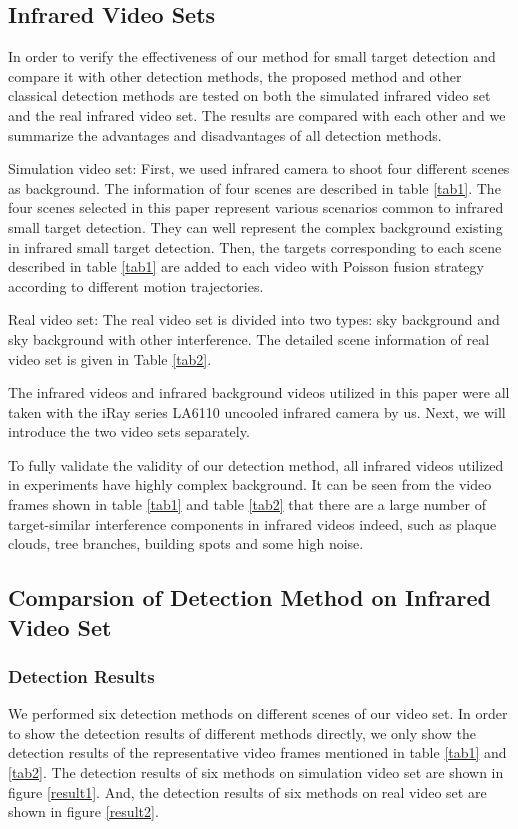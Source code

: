 \documentclass[journal]{IEEEtran}
\begin{document}
\subsection{Infrared Video Sets}
In order to verify the effectiveness of our method for small target detection and compare it with other detection methods, the proposed method and other classical detection methods are tested on both the simulated infrared video set and the real infrared video set. The results are compared with each other and we summarize the advantages and disadvantages of all detection methods.

Simulation video set: First, we used infrared camera to shoot four different scenes as background. The information of four scenes are described in table \ref{tab1}. The four scenes selected in this paper represent various scenarios common to infrared small target detection. They can well represent the complex background existing in infrared small target detection. Then, the targets corresponding to each scene described in table \ref{tab1} are added to each video with Poisson fusion strategy\cite{perez2003poisson} according to different motion trajectories.

Real video set: The real video set is divided into two types: sky background and sky background with other interference. The detailed scene information of real video set is given in Table \ref{tab2}.

The infrared videos and infrared background videos utilized in this paper were all taken with the iRay series LA6110 uncooled infrared camera by us. Next, we will introduce the two video sets separately.

To fully validate the validity of our detection method, all infrared videos utilized in experiments have highly complex background. It can be seen from the video frames shown in table \ref{tab1} and table \ref{tab2} that there are a large number of target-similar interference components in infrared videos indeed, such as plaque clouds, tree branches, building spots and some high noise.


\subsection{Comparsion of Detection Method on Infrared Video Set}
\subsubsection{Detection Results}
We performed six detection methods on different scenes of our video set. In order to show the detection results of different methods directly, we only show the detection results of the representative video frames mentioned in table \ref{tab1} and \ref{tab2}. The detection results of six methods on simulation video set are shown in figure \ref{result1}. And, the detection results of six methods on real video set are shown in figure \ref{result2}.
\end{document}
